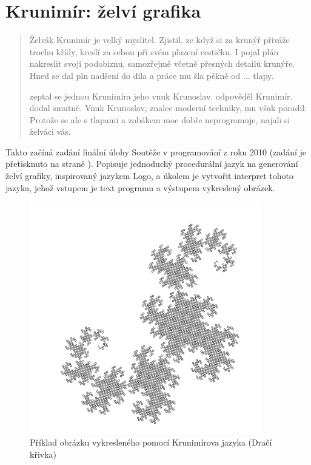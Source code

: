 \chapter{Krunimír: želví grafika}
\label{chap:krunimir}

\begin{quotation}
Želvák Krunimír je velký myslitel. Zjistil, ze když si za krunýř přiváže trochu
křídy, kreslí za sebou při svém plazení cestičku. I pojal plán nakreslit svoji
podobiznu, samozřejmě včetně přesných detailů krunýře. Hned se dal pln nadšení
do díla a práce mu šla pěkně od ... tlapy.

 zeptal se jednou Krunimíra jeho vnuk Krunoslav.
 odpověděl Krunimír.  dodal smutně.   Vnuk Krunoslav, znalec moderní techniky, mu
však poradil: 
Protože se ale s tlapami a zobákem moc dobře neprogramuje, najali si želváci
vás.
\end{quotation}

Takto začíná zadání finální úlohy Soutěže v programování z roku
2010 \cite{krunimir-task} (zadání je přetisknuto na straně
\pageref{pdf:krunimir}). Popisuje jednoduchý procedurální jazyk na generování
želví grafiky, inspirovaný jazykem Logo, a úkolem je vytvořit interpret tohoto
jazyka, jehož vstupem je text programu a výstupem vykreslený obrázek. 

\begin{figure}
  \includegraphics[width=0.9\textwidth]{krunimir/examples/dragon}
  \caption{Příklad obrázku vykresleného pomocí Krunimírova jazyka (Dračí křivka)}
  \label{fig:krunimir-dragon}
\end{figure}

